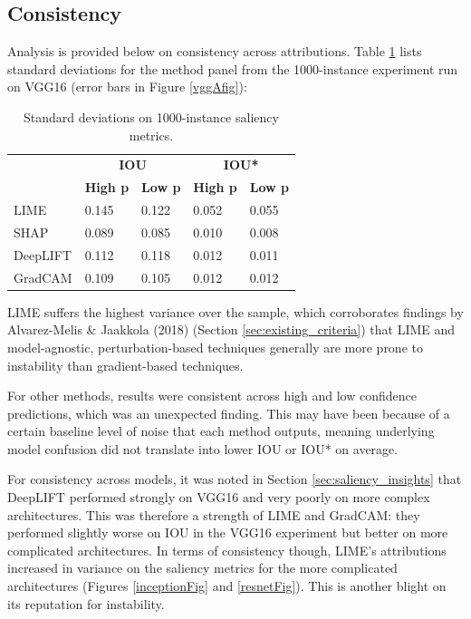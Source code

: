 \documentclass[main]{subfiles}
\begin{document}
\newpage
\subsection{Consistency}\label{sec:consistency}
Analysis is provided below on consistency across attributions. Table \ref{consistencytable} lists standard deviations for the method panel from the 1000-instance experiment run on VGG16 (error bars in Figure \ref{vggAfig}):

\begin{table}[htbp]
\centering
\begin{tabular}{l|l|l|l|l|}
\cline{2-5}
                  & \multicolumn{2}{c|}{\textbf{IOU}} & \multicolumn{2}{c|}{\textbf{IOU*}} \\ \cline{2-5} 
                  & \textbf{High p}           & \textbf{Low p}          & \textbf{High p}           & \textbf{Low p}           \\ \hline
\multicolumn{1}{|l|}{LIME}     & 0.145            & 0.122          & 0.052            & 0.055           \\ \hline
\multicolumn{1}{|l|}{SHAP}      & 0.089            & 0.085          & 0.010            & 0.008           \\ \hline
\multicolumn{1}{|l|}{DeepLIFT}  & 0.112            & 0.118          & 0.012            & 0.011           \\ \hline
\multicolumn{1}{|l|}{GradCAM}   & 0.109            & 0.105          & 0.012            & 0.012           \\ \hline
\end{tabular}

\caption{Standard deviations on 1000-instance saliency metrics.}
\label{consistencytable}

\end{table}

\noindent LIME suffers the highest variance over the sample, which corroborates findings by Alvarez-Melis \& Jaakkola (2018) (Section \ref{sec:existing_criteria}) that LIME and model-agnostic, perturbation-based techniques generally are more prone to instability than gradient-based techniques. 

For other methods, results were consistent across high and low confidence predictions, which was an unexpected finding. This may have been because of a certain baseline level of  noise that each method outputs, meaning underlying model confusion did not translate into lower IOU or IOU* on average.

For consistency across models, it was noted in Section \ref{sec:saliency_insights} that DeepLIFT performed strongly on VGG16 and very poorly on more complex architectures. This was therefore a strength of LIME and GradCAM: they performed slightly worse on IOU in the VGG16 experiment but better on more complicated architectures. In terms of consistency though, LIME's attributions increased in variance on the saliency metrics for the more complicated architectures (Figures \ref{inceptionFig} and \ref{resnetFig}). This is another blight on its reputation for instability.
\end{document}
